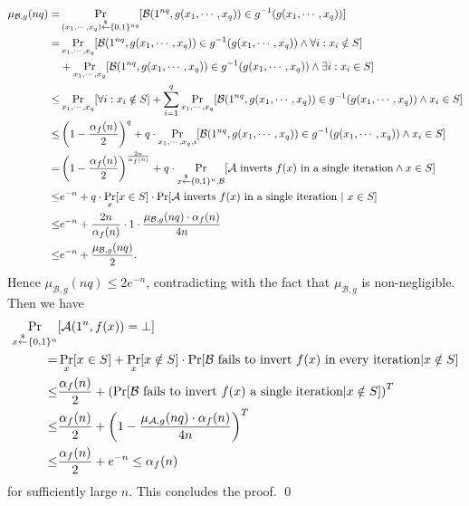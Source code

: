 \documentclass[12pt]{tufte-book}
\providecommand{\DIFaddbegin}{} %
\providecommand{\DIFaddend}{} %
\newcommand{\DIFaddincludegraphics}[2][]{{\color{blue}\fbox{\DIFOincludegraphics[#1]{#2}}}} %
\DeclareRobustCommand{\DIFaddbegin}{\DIFOaddbegin \let\includegraphics\DIFaddincludegraphics} %
\DeclareRobustCommand{\DIFaddend}{\DIFOaddend \let\includegraphics\DIFOincludegraphics} %
\begin{document}
\begin{align*}
\mu_{\mathcal{B},g}(nq) =& \Pr_{(x_1, \cdots, x_q) \stackrel{\$}{\leftarrow} \{0,1\}^{nq}}[ \mathcal{B}(1^{nq}, g(x_1, \cdots, x_q)) \in g^{-1}(g(x_1, \cdots, x_q))]\\
=&  \Pr_{x_1, \cdots, x_q}[ \mathcal{B}(1^{nq}, g(x_1, \cdots, x_q)) \in g^{-1}(g(x_1, \cdots, x_q)) \wedge \forall i: x_i \notin S]\\
& + \Pr_{x_1, \cdots, x_q}[ \mathcal{B}(1^{nq}, g(x_1, \cdots, x_q)) \in g^{-1}(g(x_1, \cdots, x_q)) \wedge \exists i: x_i \in S]\\
\leq& \Pr_{x_1, \cdots, x_q}[ \forall i: x_i \notin S]
+ \sum_{i=1}^q \Pr_{x_1, \cdots, x_q}[ \mathcal{B}(1^{nq}, g(x_1, \cdots, x_q)) \in g^{-1}(g(x_1, \cdots, x_q)) \wedge  x_i \in S]\\
\leq& \left( 1-\frac{\alpha_f(n)}{2}\right)^q
+ q \cdot \Pr_{x_1, \cdots, x_q,i}[ \mathcal{B}(1^{nq}, g(x_1, \cdots, x_q)) \in g^{-1}(g(x_1, \cdots, x_q)) \wedge x_i \in S] \\
=& \left( 1-\frac{\alpha_f(n)}{2}\right)^{\frac{2n}{\alpha_f(n)}}
+  q\cdot \Pr_{x \stackrel{\$}{\leftarrow} \{0,1\}^{n}, \mathcal{B}}[\mathcal{A} \text{ inverts $f(x)$ in a single iteration}  \wedge x \in S]\\
\leq& e^{-n} + q\cdot  \Pr_{x}[x \in S] \cdot \Pr[\mathcal{A} \text{ inverts $f(x)$ in a single iteration} ~|~ x \in S]\\
\leq& e^{-n} + \frac{2n}{\alpha_f(n)} \cdot  1 \cdot \frac{\mu_{\mathcal{B},g}(nq) \cdot \alpha_f(n)}{4n}\\
\leq& e^{-n} + \frac{\mu_{\mathcal{B},g}(nq)}{2}.
\end{align*}
Hence $\mu_{\mathcal{B},g}(nq) \leq 2 e^{-n}$, contradicting with the fact that $\mu_{\mathcal{B},g}$ is non-negligible.
Then we have
\begin{align*}
\Pr_{x \stackrel{\$}{\leftarrow} \{0,1\}^{n}}&[ \mathcal{A}(1^n, f(x)) = \bot]\\
=& \Pr_x[x \in S] + \Pr_x [x \notin S]\cdot\Pr[\mathcal{B} \text{ fails to invert $f(x)$ in every iteration} | x \notin S]\\
\leq& \frac{\alpha_f(n)}{2}+ \left(\Pr[ \mathcal{B} \text{ fails to invert $f(x)$ a single iteration} | x \notin S] \right)^T\\
\leq & \frac{\alpha_f(n)}{2}+ \left( 1-\frac{\mu_{\mathcal{A},g}(nq) \cdot \alpha_f(n)}{4n}\right)^T\\
\leq& \frac{\alpha_f(n)}{2} + e^{-n} \leq \alpha_f(n)
\end{align*}
for sufficiently large $n$. This concludes the proof.
\qed
 \DIFaddbegin \newcommand{\ma}{\mathcal{A}}
\DIFaddend 
\end{document}
